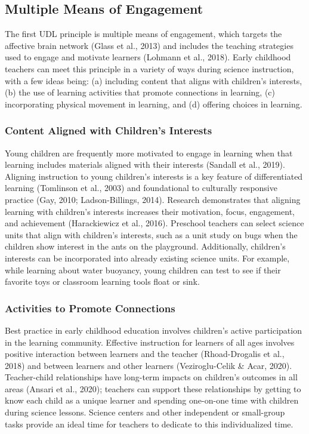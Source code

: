 \documentclass[11.5pt]{sig-alternate}
\begin{document}
\begin{large}
\subsection*{Multiple Means of Engagement}

The first UDL principle is multiple means of engagement, which targets the affective brain network (Glass et al., 2013) and includes the teaching strategies used to engage and motivate learners (Lohmann et al., 2018). Early childhood teachers can meet this principle in a variety of ways during science instruction, with a few ideas being: (a) including content that aligns with children’s interests, (b) the use of learning activities that promote connections in learning, (c) incorporating physical movement in learning, and (d) offering choices in learning.

\subsubsection*{Content Aligned with Children’s Interests}

Young children are frequently more motivated to engage in learning when that learning includes materials aligned with their interests (Sandall et al., 2019). Aligning instruction to young children’s interests is a key feature of differentiated learning (Tomlinson et al., 2003) and foundational to culturally responsive practice (Gay, 2010; Ladson-Billings, 2014). Research demonstrates that aligning learning with children’s interests increases their motivation, focus, engagement, and achievement (Harackiewicz et al., 2016). Preschool teachers can select science units that align with children’s interests, such as a unit study on bugs when the children show interest in the ants on the playground. Additionally, children’s interests can be incorporated into already existing science units. For example, while learning about water buoyancy, young children can test to see if their favorite toys or classroom learning tools float or sink.  

\subsubsection*{Activities to Promote Connections}

Best practice in early childhood education involves children’s active participation in the learning community. Effective instruction for learners of all ages involves positive interaction between learners and the teacher (Rhoad-Drogalis et al., 2018) and between learners and other learners (Veziroglu-Celik \& Acar, 2020). Teacher-child relationships have long-term impacts on children’s outcomes in all areas (Ansari et al., 2020); teachers can support these relationships by getting to know each child as a unique learner and spending one-on-one time with children during science lessons. Science centers and other independent or small-group tasks provide an ideal time for teachers to dedicate to this individualized time.


\end{large}
\end{document}
